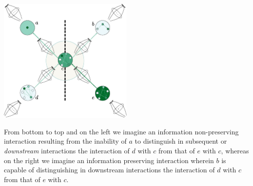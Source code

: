 \begin{frame}
\centering\includegraphics[width=0.5\textwidth]{fig/infopres.pdf}

From bottom to top and on the left we imagine an information non-preserving interaction resulting from the inability of $a$ to distinguish in subsequent or {\it downstream} interactions the interaction of $d$  with $c$ from that of $e$ with $c$, whereas on the right we imagine an information preserving interaction wherein $b$ is capable of distinguishing in downstream interactions the interaction of $d$  with $c$ from that of $e$ with $c$.
\end{frame}